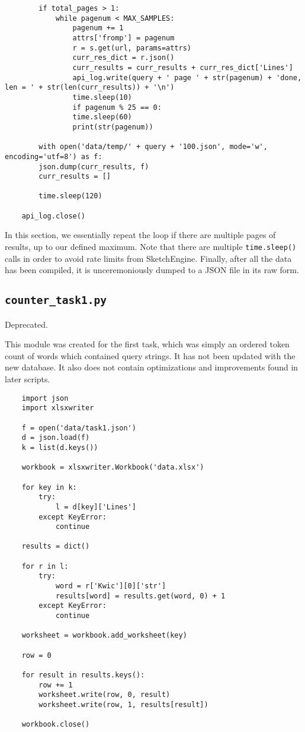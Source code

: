 \documentclass{article}      %
\begin{document}
	\begin{verbatim}
		if total_pages > 1:
			while pagenum < MAX_SAMPLES:
				pagenum += 1
				attrs['fromp'] = pagenum
				r = s.get(url, params=attrs)
				curr_res_dict = r.json()
				curr_results = curr_results + curr_res_dict['Lines']
				api_log.write(query + ' page ' + str(pagenum) + 'done, len = ' + str(len(curr_results)) + '\n')			
				time.sleep(10)
				if pagenum % 25 == 0:
				time.sleep(60)
				print(str(pagenum))
		
		with open('data/temp/' + query + '100.json', mode='w', encoding='utf=8') as f:
		json.dump(curr_results, f)
		curr_results = []
		
		time.sleep(120)
	
	api_log.close()
	\end{verbatim}
	
	In this section, we essentially repeat the loop if there are multiple pages of results, up to our defined maximum. Note that there are multiple \texttt{time.sleep()} calls in order to avoid rate limits from SketchEngine. Finally, after all the data has been compiled, it is unceremoniously dumped to a JSON file in its raw form.
	
	\subsection{\texttt{counter\_task1.py}}
	
	Deprecated.
	
	This module was created for the first task, which was simply an ordered token count of words which contained query strings. It has not been updated with the new database. It also does not contain optimizations and improvements found in later scripts.
	
	\begin{verbatim}
	import json
	import xlsxwriter
	
	f = open('data/task1.json')
	d = json.load(f)
	k = list(d.keys())
	
	workbook = xlsxwriter.Workbook('data.xlsx')
	
	for key in k:
		try:
			l = d[key]['Lines']
		except KeyError:
			continue
	
	results = dict()
	
	for r in l:
		try:
			word = r['Kwic'][0]['str']
			results[word] = results.get(word, 0) + 1
		except KeyError:
			continue
	
	worksheet = workbook.add_worksheet(key)
	
	row = 0
	
	for result in results.keys():
		row += 1
		worksheet.write(row, 0, result)
		worksheet.write(row, 1, results[result])
	
	workbook.close()
	\end{verbatim}
	
\end{document}
